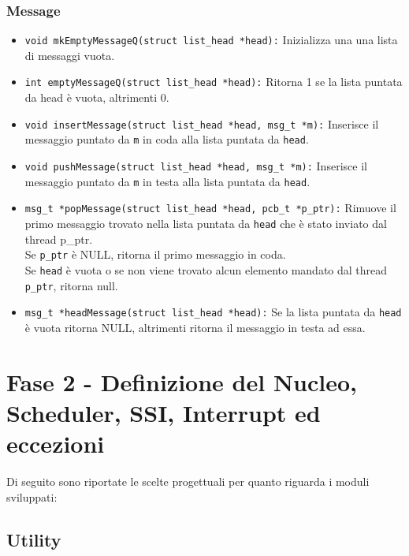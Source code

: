 \documentclass{article}
\begin{document}
	\subsubsection{Message}
	\begin{itemize}
		\item \texttt{void mkEmptyMessageQ(struct list\_head *head):} Inizializza
			una una lista di messaggi vuota.

		\item \texttt{int emptyMessageQ(struct list\_head *head):} Ritorna 1 se la
			lista puntata da head è vuota, altrimenti 0.

		\item \texttt{void insertMessage(struct list\_head *head, msg\_t *m):}
			Inserisce il messaggio puntato da \texttt{m} in coda alla lista puntata da
			\texttt{head}.

		\item \texttt{void pushMessage(struct list\_head *head, msg\_t *m):}
			Inserisce il messaggio puntato da \texttt{m} in testa alla lista puntata da
			\texttt{head}.

		\item \texttt{msg\_t *popMessage(struct list\_head *head, pcb\_t *p\_ptr):}
			Rimuove il primo messaggio trovato nella lista puntata da \texttt{head} che
			è stato inviato dal thread p\_ptr.\\ Se \texttt{p\_ptr} è NULL, ritorna il
			primo messaggio in coda. \\ Se \texttt{head} è vuota o se non viene trovato
			alcun elemento mandato dal thread \texttt{p\_ptr}, ritorna null.

		\item \texttt{msg\_t *headMessage(struct list\_head *head):} Se la lista
			puntata da \texttt{head} è vuota ritorna NULL, altrimenti ritorna il
			messaggio in testa ad essa.
	\end{itemize}

	\newpage

	\section{Fase 2 - Definizione del Nucleo, Scheduler, SSI, Interrupt ed eccezioni}
	Di seguito sono riportate le scelte progettuali per quanto riguarda i moduli sviluppati:

	\subsection{Utility}
\end{document}
